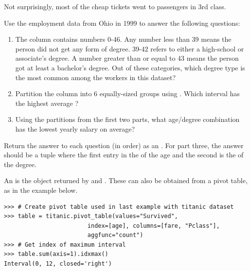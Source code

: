 Not surprisingly, most of the cheap tickets went to passengers in 3rd class.
%

\begin{problem}
Use the employment data from Ohio in 1999 to answer the following questions:

\begin{enumerate}
\item The column  contains numbers 0-46.
Any number less than 39 means the person did not get any form of degree.
39-42 refers to either a high-school or associate's degree.
A number greater than or equal to 43 means the person got at least a bachelor's degree.
Out of these categories, which degree type is the most common among the workers in this dataset?

\item Partition the  column into 6 equally-sized groups using .
Which interval has the highest average ?

\item Using the partitions from the first two parts, what age/degree combination has the lowest yearly salary on average?
\end{enumerate}

Return the answer to each question (in order) as an .
For part three, the answer should be a tuple where the first entry in the  of the age and the second is the  of the degree.

An  is the object returned by  and .
These can also be obtained from a pivot table, as in the example below.

\begin{lstlisting}
>>> # Create pivot table used in last example with titanic dataset
>>> table = titanic.pivot_table(values="Survived",
                        index=[age], columns=[fare, "Pclass"],
                        aggfunc="count")
>>> # Get index of maximum interval
>>> table.sum(axis=1).idxmax()
Interval(0, 12, closed='right')

\end{lstlisting}
\end{problem}

